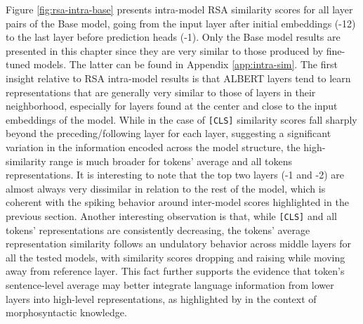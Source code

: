 \documentclass[a4paper, nobind]{templates/ociamthesis}
\begin{document}
Figure \ref{fig:rsa-intra-base} presents intra-model RSA similarity scores for all layer pairs of the Base model, going from the input layer after initial embeddings (-12) to the last layer before prediction heads (-1). Only the Base model results are presented in this chapter since they are very similar to those produced by fine-tuned models. The latter can be found in Appendix \ref{app:intra-sim}. The first insight relative to RSA intra-model results is that ALBERT layers tend to learn representations that are generally very similar to those of layers in their neighborhood, especially for layers found at the center and close to the input embeddings of the model. While in the case of \texttt{{[}CLS{]}} similarity scores fall sharply beyond the preceding/following layer for each layer, suggesting a significant variation in the information encoded across the model structure, the high-similarity range is much broader for tokens' average and all tokens representations. It is interesting to note that the top two layers (-1 and -2) are almost always very dissimilar in relation to the rest of the model, which is coherent with the spiking behavior around inter-model scores highlighted in the previous section. Another interesting observation is that, while \texttt{{[}CLS{]}} and all tokens' representations are consistently decreasing, the tokens' average representation similarity follows an undulatory behavior across middle layers for all the tested models, with similarity scores dropping and raising while moving away from reference layer. This fact further supports the evidence that token's sentence-level average may better integrate language information from lower layers into high-level representations, as highlighted by \textcite{miaschi-dellorletta-2020-contextual} in the context of morphosyntactic knowledge.
\end{document}
